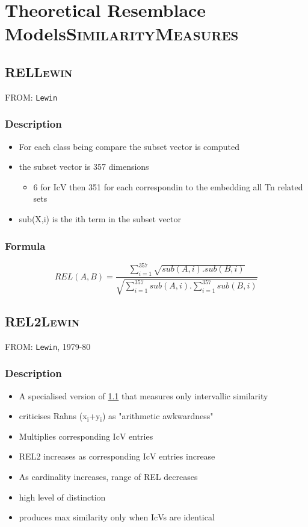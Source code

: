 \documentclass[11pt]{article}
\begin{document}
\section{Theoretical Resemblace Models\hfill{}\textsc{SimilarityMeasures}}
\label{sec-3}
\subsection{REL\hfill{}\textsc{Lewin}}
\label{sec-3-1}
FROM: \texttt{Lewin}
\subsubsection{Description}
\label{sec-3-1-1}
\begin{itemize}
\item For each class being compare the subset vector is computed
\item the subset vector is 357 dimensions
\begin{itemize}
\item 6 for IcV then 351 for each correspondin to the embedding all
Tn related sets
\end{itemize}
\item sub(X,i) is the ith term in the subset vector
\end{itemize}

\subsubsection{Formula}
\label{sec-3-1-2}
$$ REL ( A,B ) = \frac{\sum_{i=1}^{357}\sqrt{sub(A,i).sub(B,i)} }{\sqrt{\sum_{i=1}^{357}sub(A,i).\sum_{i=1}^{357}sub(B,i)}} $$

\subsection{REL2\hfill{}\textsc{Lewin}}
\label{sec-3-2}
FROM: \texttt{Lewin}, 1979-80
\subsubsection{Description}
\label{sec-3-2-1}
\begin{itemize}
\item A specialised version of \ref{sec-3-1} that measures only intervallic
similarity
\item criticises Rahns (x$_{\text{i}}$+y$_{\text{i}}$) as "arithmetic awkwardness"
\item Multiplies corresponding IcV entries
\item REL2 increases as corresponding IcV entries increase
\item As cardinality increases, range of REL decreases
\item high level of distinction
\item produces max similarity only when IcVs are identical
\end{itemize}
\end{document}
